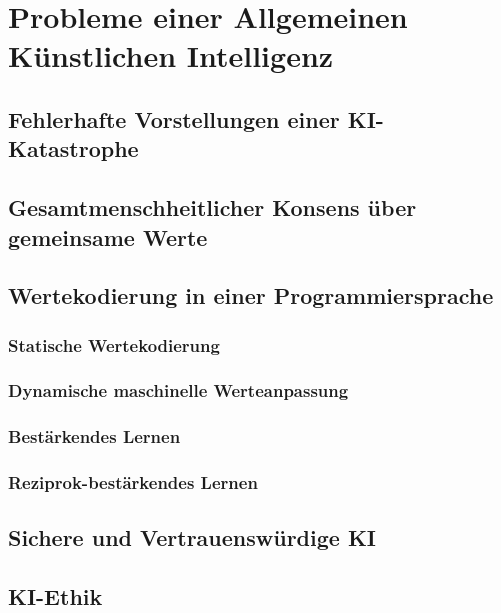 \chapter{Probleme einer Allgemeinen Künstlichen Intelligenz}
\section{Fehlerhafte Vorstellungen einer KI-Katastrophe}
\section{Gesamtmenschheitlicher Konsens über gemeinsame Werte}
\section{Wertekodierung in einer Programmiersprache}
\subsection{Statische Wertekodierung}
\subsection{Dynamische maschinelle Werteanpassung}
\subsection{Bestärkendes Lernen}
\subsection{Reziprok-bestärkendes Lernen}
\section{Sichere und Vertrauenswürdige KI}
\section{KI-Ethik}
